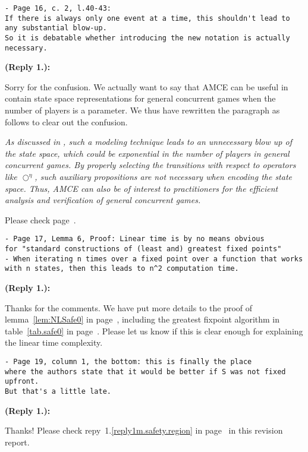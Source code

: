 \documentclass[times,10pt,twocolumn]{article}
\newcommand{\nxt}{\bigcirc}
\newcounter{cabbage0}
\newcounter{cabbage1}
\newcounter{cabbage2}
\newcounter{cabbage3}
\newcounter{bean0}
\newcounter{bean1}
\newcounter{bean2}
\newcounter{bean3}
\newcounter{bean4}
\newcounter{bean5}
\newcounter{bean6}
\newenvironment{reply1}{\begin{list}{\bf (Reply 1.\arabic{bean1}):} 
        {\usecounter{bean1}\setcounter{bean1}{\value{cabbage1}} \item \setcounter{cabbage1}{\value{bean1}} 
        }
}{\end{list}}
\begin{document}
\begin{verbatim} 
- Page 16, c. 2, l.40-43: 
If there is always only one event at a time, this shouldn't lead to 
any substantial blow-up. 
So it is debatable whether introducing the new notation is actually necessary.
\end{verbatim} 
\begin{reply1} 
Sorry for the confusion. 
We actually want to say that AMCE can be useful in contain 
state space representations for general concurrent games when 
the number of players is a parameter. 
We thus have rewritten the paragraph as follows to clear out the 
confusion. 
\begin{center} 
\parbox{140mm}{\em 
As discussed in \cite{Wang04}, such a modeling technique leads to an unnecessary 
blow up of the state space, which could be exponential in the number 
of players in general concurrent games.  
By properly selecting 
the transitions with respect to operators like $\nxt^\eta$, 
such auxiliary propositions are not necessary when encoding the state space.  
Thus, AMCE can also be of interest to practitioners for the
efficient analysis and verification of general concurrent games.  
}
\end{center} 
Please check page~\pageref{reply1.event.blowup}.  
\end{reply1} 
\begin{verbatim} 
- Page 17, Lemma 6, Proof: Linear time is by no means obvious 
for "standard constructions of (least and) greatest fixed points" 
- When iterating n times over a fixed point over a function that works 
with n states, then this leads to n^2 computation time.
\end{verbatim}
\begin{reply1} 
Thanks for the comments. 
We have put more details to the proof of lemma~\ref{lem:NLSafe0} 
in page~\pageref{lem:NLSafe0}, including 
the greatest fixpoint algorithm in table~\ref{tab.safe0} in 
page~\pageref{tab.safe0}.  
Please let us know if this is clear enough for explaining the 
linear time complexity.  
\end{reply1} 
\begin{verbatim} 
- Page 19, column 1, the bottom: this is finally the place 
where the authors state that it would be better if S was not fixed upfront. 
But that's a little late.
\end{verbatim} 
\begin{reply1} 
Thanks! 
Please check repy~1.\ref{reply1m.safety.region} in 
page~\pageref{reply1m.safety.region} in this revision report. 
\end{reply1} 
\end{document}
